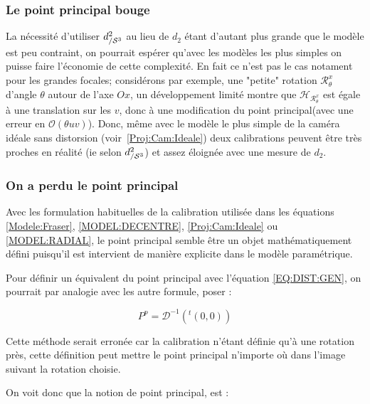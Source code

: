 \subsubsection{Le point principal bouge}

La n\'ecessit\'e d'utiliser $\DdSt$ au lieu de $d_2$ \'etant d'autant plus
grande que  le mod\`ele est peu contraint, on pourrait esp\'erer qu'avec
les mod\`eles les plus simples on puisse faire l'\'economie de cette
complexit\'e. En fait ce n'est pas le cas notament pour les grandes
focales;  consid\'erons par exemple, une "petite" rotation
 $\mathcal{R}^x_\theta$ d'angle $\theta$ autour de l'axe $Ox$, un
d\'eveloppement limit\'e montre que $\mathcal{H}_{\mathcal{R}^x_\theta}$
est \'egale \`a une translation sur les $v$, donc \`a une modification
du point principal(avec une erreur en $\mathcal{O}(\theta uv)$). Donc, m\^eme
avec le mod\`ele le plus simple de la cam\'era id\'eale sans
distorsion (voir~\ref{Proj:Cam:Ideale})  deux calibrations peuvent
\^etre tr\`es proches en r\'ealit\'e (ie selon $\DdSt$) et assez
\'eloign\'ee avec une mesure de $d_2$.



\label{DIST:HORS:GR}
\subsubsection{On a perdu le point principal}

Avec les formulation habituelles de la calibration utilis\'ee dans les
\'equations \ref{Modele:Fraser},
\ref{MODEL:DECENTRE}, \ref{Proj:Cam:Ideale} ou \ref{MODEL:RADIAL}, le
point principal semble \^etre un objet math\'ematiquement  
d\'efini puisqu'il est 
intervient de mani\`ere explicite dans le mod\`ele param\'etrique.

Pour d\'efinir un \'equivalent du point principal  avec l'\'equation
\ref{EQ:DIST:GEN}, on pourrait par analogie avec les autre formule,
poser :

\begin{equation}
   P^p = \mathcal{D}^{-1} (^t(0,0))
\end{equation}

Cette m\'ethode serait erron\'ee car la calibration n'\'etant
d\'efinie qu'\`a une rotation pr\`es, cette d\'efinition peut mettre
le point principal n'importe o\`u dans l'image suivant la rotation choisie.

On voit donc que la notion de point principal, est :  

